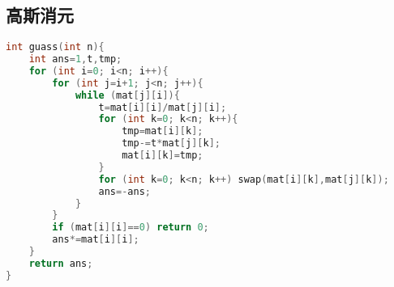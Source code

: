 \subsection{高斯消元}
\begin{lstlisting}[language=C++]
int guass(int n){
	int ans=1,t,tmp;
	for (int i=0; i<n; i++){
		for (int j=i+1; j<n; j++){
			while (mat[j][i]){
				t=mat[i][i]/mat[j][i];
				for (int k=0; k<n; k++){
					tmp=mat[i][k];
					tmp-=t*mat[j][k];
					mat[i][k]=tmp;
				}
				for (int k=0; k<n; k++) swap(mat[i][k],mat[j][k]);
				ans=-ans;
			}
		}
		if (mat[i][i]==0) return 0;	
		ans*=mat[i][i];
	}
	return ans;
}
\end{lstlisting}
